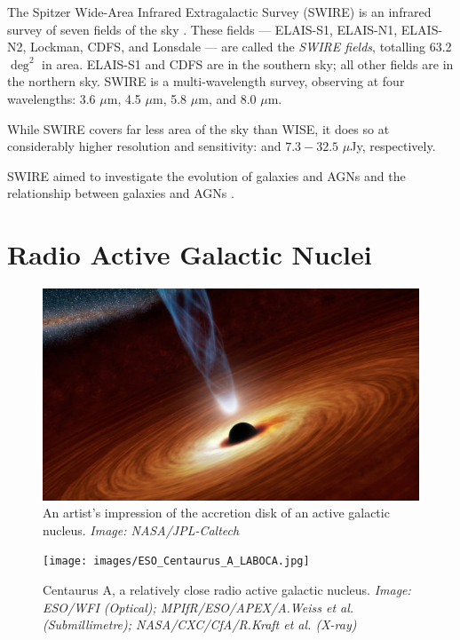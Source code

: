             The Spitzer Wide-Area Infrared Extragalactic Survey (SWIRE) is an
            infrared survey of seven fields of the sky
            \citep{lonsdale03}. These fields --- ELAIS-S1, ELAIS-N1, ELAIS-N2,
            Lockman, CDFS, and Lonsdale --- are called the \emph{SWIRE fields},
            totalling 63.2 $\deg^2$ in area. ELAIS-S1 and CDFS are in the
            southern sky; all other fields are in the northern sky. SWIRE is a
            multi-wavelength survey, observing at four wavelengths: 3.6 $\mu$m,
            4.5 $\mu$m, 5.8 $\mu$m, and 8.0 $\mu$m.

            While SWIRE covers far less area of the sky than WISE, it does so at
            considerably higher resolution and sensitivity:  and $7.3 - 32.5$ $\mu$Jy, respectively.

            SWIRE aimed to investigate the evolution of galaxies and AGNs and
            the relationship between galaxies and AGNs \citep{surace05}.

    \section{Radio Active Galactic Nuclei}
    \label{sec:agns}

        \begin{figure}[!ht]
            \centering
            \includegraphics[height=0.2\textheight]
                {images/accretion_disk_artist_impression.jpg}
            \caption{An artist's impression of the accretion disk of an active
                galactic nucleus. \emph{Image: NASA/JPL-Caltech}}
            \label{fig:accretion-disk}
        \end{figure}

        \begin{figure}[!ht]
            \centering
            \texttt{[image: images/ESO\_Centaurus\_A\_LABOCA.jpg]}
            \caption{Centaurus A, a relatively close radio active galactic
                nucleus. \emph{Image: ESO/WFI (Optical); MPIfR/ESO/APEX/A.Weiss
                et al. (Submillimetre); NASA/CXC/CfA/R.Kraft et al. (X-ray)}}
            \label{fig:centaurus-a}
        \end{figure}

